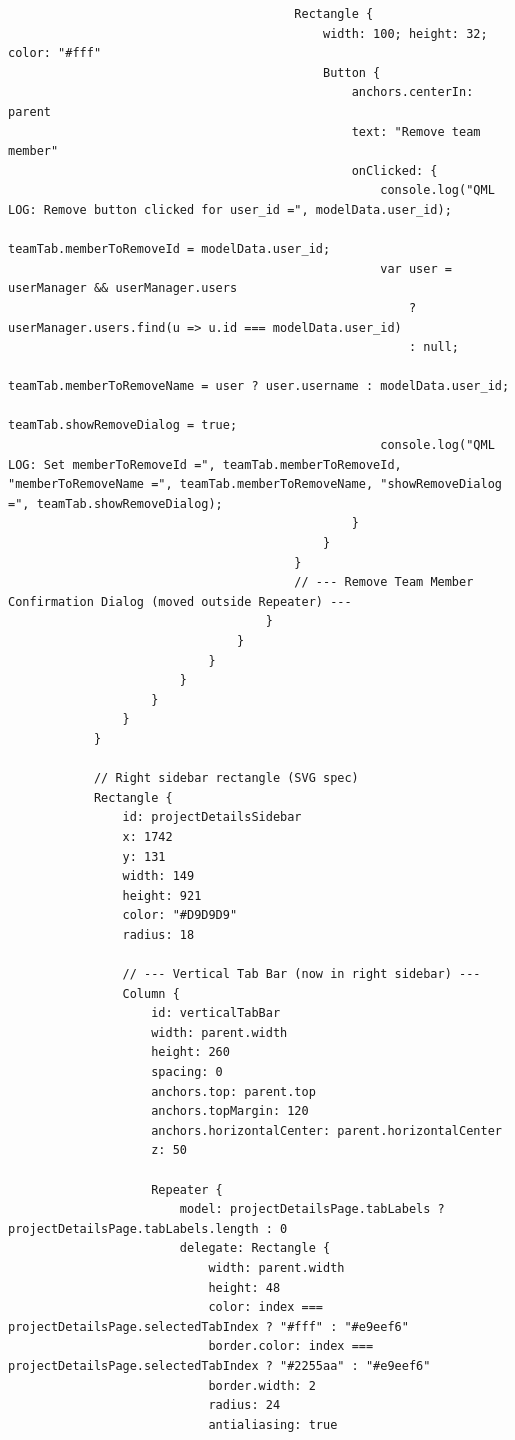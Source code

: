 \documentclass{report}
\begin{document}
\begin{lstlisting}
                                        Rectangle {
                                            width: 100; height: 32; color: "#fff"
                                            Button {
                                                anchors.centerIn: parent
                                                text: "Remove team member"
                                                onClicked: {
                                                    console.log("QML LOG: Remove button clicked for user_id =", modelData.user_id);
                                                    teamTab.memberToRemoveId = modelData.user_id;
                                                    var user = userManager && userManager.users
                                                        ? userManager.users.find(u => u.id === modelData.user_id)
                                                        : null;
                                                    teamTab.memberToRemoveName = user ? user.username : modelData.user_id;
                                                    teamTab.showRemoveDialog = true;
                                                    console.log("QML LOG: Set memberToRemoveId =", teamTab.memberToRemoveId, "memberToRemoveName =", teamTab.memberToRemoveName, "showRemoveDialog =", teamTab.showRemoveDialog);
                                                }
                                            }
                                        }
                                        // --- Remove Team Member Confirmation Dialog (moved outside Repeater) ---
                                    }
                                }
                            }
                        }
                    }
                }
            }

            // Right sidebar rectangle (SVG spec)
            Rectangle {
                id: projectDetailsSidebar
                x: 1742
                y: 131
                width: 149
                height: 921
                color: "#D9D9D9"
                radius: 18

                // --- Vertical Tab Bar (now in right sidebar) ---
                Column {
                    id: verticalTabBar
                    width: parent.width
                    height: 260
                    spacing: 0
                    anchors.top: parent.top
                    anchors.topMargin: 120
                    anchors.horizontalCenter: parent.horizontalCenter
                    z: 50

                    Repeater {
                        model: projectDetailsPage.tabLabels ? projectDetailsPage.tabLabels.length : 0
                        delegate: Rectangle {
                            width: parent.width
                            height: 48
                            color: index === projectDetailsPage.selectedTabIndex ? "#fff" : "#e9eef6"
                            border.color: index === projectDetailsPage.selectedTabIndex ? "#2255aa" : "#e9eef6"
                            border.width: 2
                            radius: 24
                            antialiasing: true


\end{lstlisting}
\end{document}
